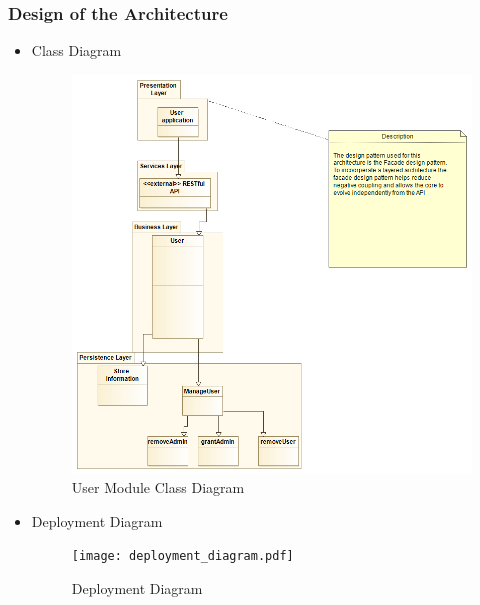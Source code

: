 \documentclass{article}
\begin{document}
	\subsubsection{Design of the Architecture}
		\begin{itemize}
 				\item Class Diagram
 				\begin{center}
					\begin{figure}[!h]
					\includegraphics[scale=0.5]{cdu.png}
					\caption{User Module Class Diagram}
					\end{figure}
				\end{center}
	 			\clearpage
	 			
	 			\item Deployment Diagram				
	 			\begin{center}
	 				\begin{figure}[!h]
	 					\texttt{[image: deployment\_diagram.pdf]}
	 					\caption{Deployment Diagram}
	 				\end{figure}
	 			\end{center}
	 			

\end{itemize}
\end{document}
